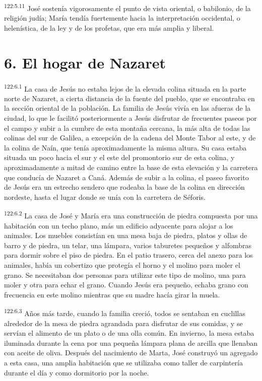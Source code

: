 \par
\textsuperscript{122:5.11} José sostenía vigorosamente el punto de vista oriental, o babilonio, de la religión judía; María tendía fuertemente hacia la interpretación occidental, o helenística, de la ley y de los profetas, que era más amplia y liberal.

\section*{6. El hogar de Nazaret}
\par
\textsuperscript{122:6.1} La casa de Jesús no estaba lejos de la elevada colina situada en la parte norte de Nazaret, a cierta distancia de la fuente del pueblo, que se encontraba en la sección oriental de la población. La familia de Jesús vivía en las afueras de la ciudad, lo que le facilitó posteriormente a Jesús disfrutar de frecuentes paseos por el campo y subir a la cumbre de esta montaña cercana, la más alta de todas las colinas del sur de Galilea, a excepción de la cadena del Monte Tabor al este, y de la colina de Naín, que tenía aproximadamente la misma altura. Su casa estaba situada un poco hacia el sur y el este del promontorio sur de esta colina, y aproximadamente a mitad de camino entre la base de esta elevación y la carretera que conducía de Nazaret a Caná. Además de subir a la colina, el paseo favorito de Jesús era un estrecho sendero que rodeaba la base de la colina en dirección nordeste, hasta el lugar donde se unía con la carretera de Séforis.

\par
\textsuperscript{122:6.2} La casa de José y María era una construcción de piedra compuesta por una habitación con un techo plano, más un edificio adyacente para alojar a los animales. Los muebles consistían en una mesa baja de piedra, platos y ollas de barro y de piedra, un telar, una lámpara, varios taburetes pequeños y alfombras para dormir sobre el piso de piedra. En el patio trasero, cerca del anexo para los animales, había un cobertizo que protegía el horno y el molino para moler el grano. Se necesitaban dos personas para utilizar este tipo de molino, una para moler y otra para echar el grano. Cuando Jesús era pequeño, echaba grano con frecuencia en este molino mientras que su madre hacía girar la muela.

\par
\textsuperscript{122:6.3} Años más tarde, cuando la familia creció, todos se sentaban en cuclillas alrededor de la mesa de piedra agrandada para disfrutar de sus comidas, y se servían el alimento de un plato o de una olla común. En invierno, la mesa estaba iluminada durante la cena por una pequeña lámpara plana de arcilla que llenaban con aceite de oliva. Después del nacimiento de Marta, José construyó un agregado a esta casa, una amplia habitación que se utilizaba como taller de carpintería durante el día y como dormitorio por la noche.

